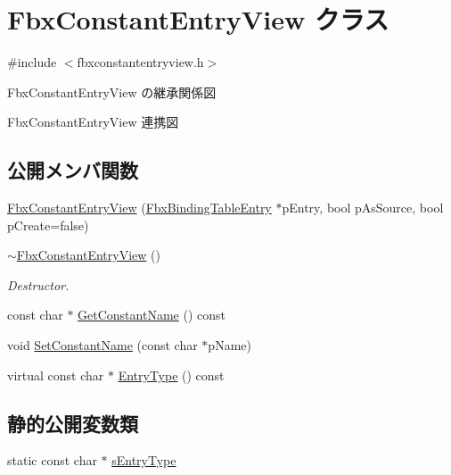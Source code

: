 \hypertarget{class_fbx_constant_entry_view}{}\section{Fbx\+Constant\+Entry\+View クラス}
\label{class_fbx_constant_entry_view}


{\ttfamily \#include $<$fbxconstantentryview.\+h$>$}



Fbx\+Constant\+Entry\+View の継承関係図


Fbx\+Constant\+Entry\+View 連携図
\subsection*{公開メンバ関数}
\begin{DoxyCompactItemize}
\item 
\hyperlink{class_fbx_constant_entry_view_af49c9691fe825c0b62b3abe96c7ca823}{Fbx\+Constant\+Entry\+View} (\hyperlink{class_fbx_binding_table_entry}{Fbx\+Binding\+Table\+Entry} $\ast$p\+Entry, bool p\+As\+Source, bool p\+Create=false)
\item 
\hyperlink{class_fbx_constant_entry_view_a2d48b5460eb2b55547c0156d1774222e}{$\sim$\+Fbx\+Constant\+Entry\+View} ()
\begin{DoxyCompactList}\small\item\em Destructor. \end{DoxyCompactList}\item 
const char $\ast$ \hyperlink{class_fbx_constant_entry_view_a5e61786ae363b4281f5515e225722700}{Get\+Constant\+Name} () const
\item 
void \hyperlink{class_fbx_constant_entry_view_abe9370dc86bcdfb7b9ef617d2317f4b2}{Set\+Constant\+Name} (const char $\ast$p\+Name)
\item 
virtual const char $\ast$ \hyperlink{class_fbx_constant_entry_view_a7ea7fc9df5e1316854d18ffcc797e564}{Entry\+Type} () const
\end{DoxyCompactItemize}
\subsection*{静的公開変数類}
\begin{DoxyCompactItemize}
\item 
static const char $\ast$ \hyperlink{class_fbx_constant_entry_view_a9613da66bae01aaedaf6a08f6f538126}{s\+Entry\+Type}
\end{DoxyCompactItemize}
